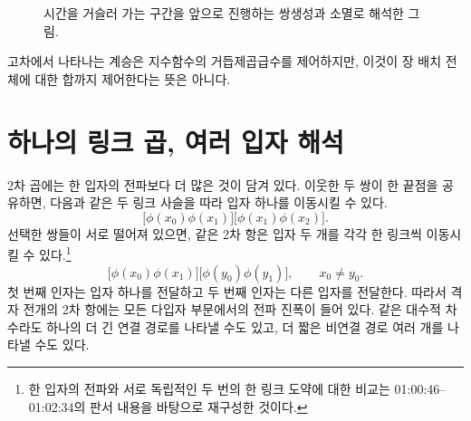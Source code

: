 \begin{figure}[htbp]
\centering
{}
\caption{시간을 거슬러 가는 구간을 앞으로 진행하는 쌍생성과 소멸로 해석한 그림.}
\end{figure}

고차에서 나타나는 계승은 지수함수의 거듭제곱급수를 제어하지만, 이것이 장 배치 전체에 대한 합까지 제어한다는 뜻은 아니다.

\begin{classroomqa}
\end{classroomqa}

\section{하나의 링크 곱, 여러 입자 해석}

2차 곱에는 한 입자의 전파보다 더 많은 것이 담겨 있다. 이웃한 두 쌍이 한 끝점을 공유하면, 다음과 같은 두 링크 사슬을 따라 입자 하나를 이동시킬 수 있다.
\begin{equation}
\bigl[\phi(x_0)\phi(x_1)\bigr]
\bigl[\phi(x_1)\phi(x_2)\bigr].
\end{equation}
선택한 쌍들이 서로 떨어져 있으면, 같은 2차 항은 입자 두 개를 각각 한 링크씩 이동시킬 수 있다.\footnote{한 입자의 전파와 서로 독립적인 두 번의 한 링크 도약에 대한 비교는 01:00:46--01:02:34의 판서 내용을 바탕으로 재구성한 것이다.}
\begin{equation}
\bigl[\phi(x_0)\phi(x_1)\bigr]
\bigl[\phi(y_0)\phi(y_1)\bigr],
\qquad x_0\neq y_0.
\end{equation}
첫 번째 인자는 입자 하나를 전달하고 두 번째 인자는 다른 입자를 전달한다. 따라서 격자 전개의 2차 항에는 모든 다입자 부문에서의 전파 진폭이 들어 있다. 같은 대수적 차수라도 하나의 더 긴 연결 경로를 나타낼 수도 있고, 더 짧은 비연결 경로 여러 개를 나타낼 수도 있다.

